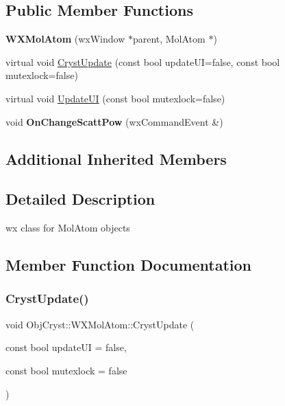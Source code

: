 \subsection*{Public Member Functions}
\begin{DoxyCompactItemize}
\item 
\mbox{\label{class_obj_cryst_1_1_w_x_mol_atom_ae921caf4a024c3d5a3823fe06032dbc0}} 
{\bfseries W\+X\+Mol\+Atom} (wx\+Window $\ast$parent, Mol\+Atom $\ast$)
\item 
virtual void \mbox{\hyperlink{class_obj_cryst_1_1_w_x_mol_atom_a2b12f264ad4893b1f0b8381abe5b5742}{Cryst\+Update}} (const bool update\+UI=false, const bool mutexlock=false)
\item 
virtual void \mbox{\hyperlink{class_obj_cryst_1_1_w_x_mol_atom_a85a5d3b73dfd84fbba194f9eac7a40d5}{Update\+UI}} (const bool mutexlock=false)
\item 
\mbox{\label{class_obj_cryst_1_1_w_x_mol_atom_a81b5ddf74808c63edf2407410d1cd56d}} 
void {\bfseries On\+Change\+Scatt\+Pow} (wx\+Command\+Event \&)
\end{DoxyCompactItemize}
\subsection*{Additional Inherited Members}


\subsection{Detailed Description}
wx class for Mol\+Atom objects 

\subsection{Member Function Documentation}
\mbox{\label{class_obj_cryst_1_1_w_x_mol_atom_a2b12f264ad4893b1f0b8381abe5b5742}} 
\subsubsection{\texorpdfstring{CrystUpdate()}{CrystUpdate()}}
{\footnotesize\ttfamily void Obj\+Cryst\+::\+W\+X\+Mol\+Atom\+::\+Cryst\+Update (\begin{DoxyParamCaption}\item[{const bool}]{update\+UI = {\ttfamily false},  }\item[{const bool}]{mutexlock = {\ttfamily false} }\end{DoxyParamCaption})\hspace{0.3cm}{\ttfamily [virtual]}}

